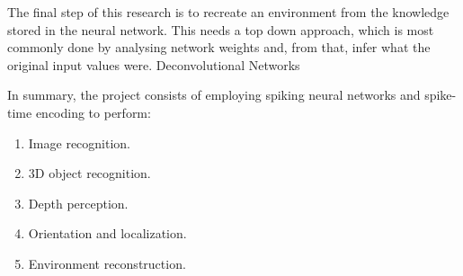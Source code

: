 The final step of this research is to recreate an environment from the knowledge stored in the neural network. This needs a top down approach, which is most commonly done by analysing network weights and, from that, infer what the original input values were. 
Deconvolutional Networks

In summary, the project consists of employing spiking neural networks and spike-time encoding to perform:
\begin{enumerate}
  \item Image recognition.
  \item 3D object recognition.
  \item Depth perception.
  \item Orientation and localization.
  \item Environment reconstruction.
\end{enumerate}